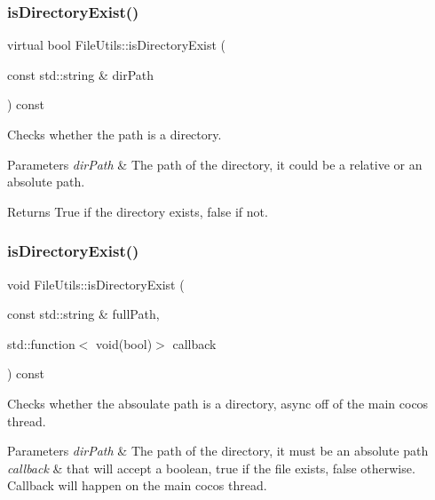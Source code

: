 \subsubsection{\texorpdfstring{is\+Directory\+Exist()}{isDirectoryExist()}\hspace{0.1cm}{\footnotesize\ttfamily [2/3]}}
{\footnotesize\ttfamily virtual bool File\+Utils\+::is\+Directory\+Exist (\begin{DoxyParamCaption}\item[{const std\+::string \&}]{dir\+Path }\end{DoxyParamCaption}) const\hspace{0.3cm}{\ttfamily [virtual]}}

Checks whether the path is a directory.


\begin{DoxyParams}{Parameters}
{\em dir\+Path} & The path of the directory, it could be a relative or an absolute path. \\
\hline
\end{DoxyParams}
\begin{DoxyReturn}{Returns}
True if the directory exists, false if not. 
\end{DoxyReturn}
\mbox{\label{classFileUtils_ae611008ddcaf05f7361876b1f2d37753}} 
\subsubsection{\texorpdfstring{is\+Directory\+Exist()}{isDirectoryExist()}\hspace{0.1cm}{\footnotesize\ttfamily [3/3]}}
{\footnotesize\ttfamily void File\+Utils\+::is\+Directory\+Exist (\begin{DoxyParamCaption}\item[{const std\+::string \&}]{full\+Path,  }\item[{std\+::function$<$ void(bool)$>$}]{callback }\end{DoxyParamCaption}) const\hspace{0.3cm}{\ttfamily [virtual]}}

Checks whether the absoulate path is a directory, async off of the main cocos thread.


\begin{DoxyParams}{Parameters}
{\em dir\+Path} & The path of the directory, it must be an absolute path \\
\hline
{\em callback} & that will accept a boolean, true if the file exists, false otherwise. Callback will happen on the main cocos thread. \\
\hline
\end{DoxyParams}
\mbox{\label{classFileUtils_a6f2a350e8f2b15219637b40bed4c38ec}} 
